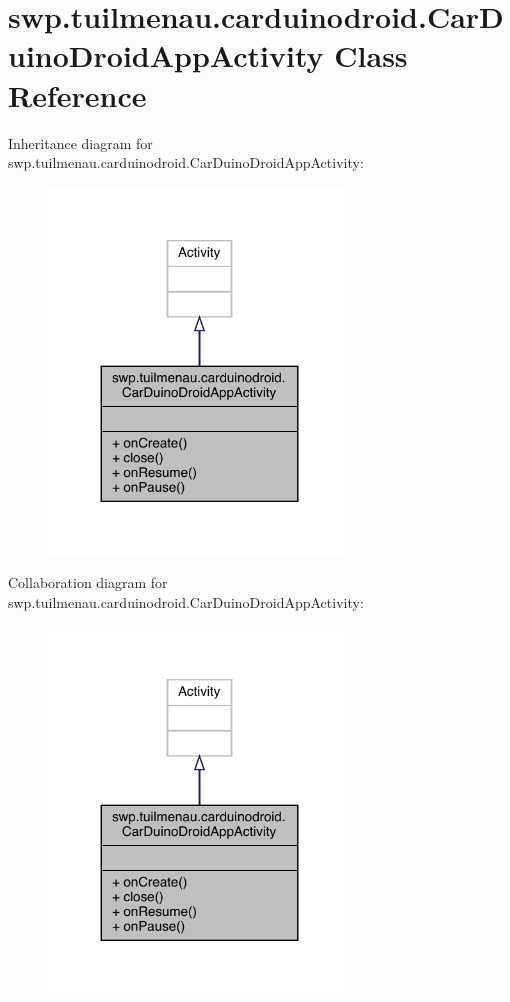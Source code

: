 \hypertarget{classswp_1_1tuilmenau_1_1carduinodroid_1_1_car_duino_droid_app_activity}{}\section{swp.\+tuilmenau.\+carduinodroid.\+Car\+Duino\+Droid\+App\+Activity Class Reference}
\label{classswp_1_1tuilmenau_1_1carduinodroid_1_1_car_duino_droid_app_activity}


Inheritance diagram for swp.\+tuilmenau.\+carduinodroid.\+Car\+Duino\+Droid\+App\+Activity\+:
\nopagebreak
\begin{figure}[H]
\begin{center}
\leavevmode
\includegraphics[width=227pt]{classswp_1_1tuilmenau_1_1carduinodroid_1_1_car_duino_droid_app_activity__inherit__graph}
\end{center}
\end{figure}


Collaboration diagram for swp.\+tuilmenau.\+carduinodroid.\+Car\+Duino\+Droid\+App\+Activity\+:
\nopagebreak
\begin{figure}[H]
\begin{center}
\leavevmode
\includegraphics[width=227pt]{classswp_1_1tuilmenau_1_1carduinodroid_1_1_car_duino_droid_app_activity__coll__graph}
\end{center}
\end{figure}
